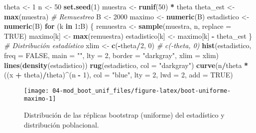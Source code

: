 \documentclass[
]{book}
\newenvironment{Shaded}{\begin{snugshade}}{\end{snugshade}}
\newcommand{\CommentTok}[1]{\textcolor[rgb]{0.56,0.35,0.01}{\textit{#1}}}
\newcommand{\ControlFlowTok}[1]{\textcolor[rgb]{0.13,0.29,0.53}{\textbf{#1}}}
\newcommand{\DataTypeTok}[1]{\textcolor[rgb]{0.13,0.29,0.53}{#1}}
\newcommand{\DecValTok}[1]{\textcolor[rgb]{0.00,0.00,0.81}{#1}}
\newcommand{\KeywordTok}[1]{\textcolor[rgb]{0.13,0.29,0.53}{\textbf{#1}}}
\newcommand{\NormalTok}[1]{#1}
\newcommand{\OperatorTok}[1]{\textcolor[rgb]{0.81,0.36,0.00}{\textbf{#1}}}
\newcommand{\OtherTok}[1]{\textcolor[rgb]{0.56,0.35,0.01}{#1}}
\newcommand{\StringTok}[1]{\textcolor[rgb]{0.31,0.60,0.02}{#1}}
\theoremstyle{definition}
\theoremstyle{definition}
\theoremstyle{definition}
\theoremstyle{remark}
\begin{document}
\begin{Shaded}
\begin{Highlighting}[]
\NormalTok{theta <-}\StringTok{ }\DecValTok{1}
\NormalTok{n <-}\StringTok{ }\DecValTok{50}
\KeywordTok{set.seed}\NormalTok{(}\DecValTok{1}\NormalTok{)}
\NormalTok{muestra <-}\StringTok{ }\KeywordTok{runif}\NormalTok{(}\DecValTok{50}\NormalTok{) }\OperatorTok{*}\StringTok{ }\NormalTok{theta}
\NormalTok{theta_est <-}\StringTok{ }\KeywordTok{max}\NormalTok{(muestra)}
\CommentTok{# Remuestreo}
\NormalTok{B <-}\StringTok{ }\DecValTok{2000}
\NormalTok{maximo <-}\StringTok{ }\KeywordTok{numeric}\NormalTok{(B)}
\NormalTok{estadistico <-}\StringTok{ }\KeywordTok{numeric}\NormalTok{(B)}
\ControlFlowTok{for}\NormalTok{ (k }\ControlFlowTok{in} \DecValTok{1}\OperatorTok{:}\NormalTok{B) \{}
\NormalTok{    remuestra <-}\StringTok{ }\KeywordTok{sample}\NormalTok{(muestra, n, }\DataTypeTok{replace =} \OtherTok{TRUE}\NormalTok{)}
\NormalTok{    maximo[k] <-}\StringTok{ }\KeywordTok{max}\NormalTok{(remuestra)}
\NormalTok{    estadistico[k] <-}\StringTok{ }\NormalTok{maximo[k] }\OperatorTok{-}\StringTok{ }\NormalTok{theta_est}
\NormalTok{\}}
\CommentTok{# Distribución estadístico}
\NormalTok{xlim <-}\StringTok{ }\KeywordTok{c}\NormalTok{(}\OperatorTok{-}\NormalTok{theta}\OperatorTok{/}\DecValTok{2}\NormalTok{, }\DecValTok{0}\NormalTok{) }\CommentTok{# c(-theta, 0)}
\KeywordTok{hist}\NormalTok{(estadistico, }\DataTypeTok{freq =} \OtherTok{FALSE}\NormalTok{, }\DataTypeTok{main =} \StringTok{""}\NormalTok{, }\DataTypeTok{lty =} \DecValTok{2}\NormalTok{, }
     \DataTypeTok{border =} \StringTok{"darkgray"}\NormalTok{, }\DataTypeTok{xlim =}\NormalTok{ xlim)}
\KeywordTok{lines}\NormalTok{(}\KeywordTok{density}\NormalTok{(estadistico))}
\KeywordTok{rug}\NormalTok{(estadistico, }\DataTypeTok{col =} \StringTok{"darkgray"}\NormalTok{)}
\KeywordTok{curve}\NormalTok{(n}\OperatorTok{/}\NormalTok{theta }\OperatorTok{*}\StringTok{ }\NormalTok{((x }\OperatorTok{+}\StringTok{ }\NormalTok{theta)}\OperatorTok{/}\NormalTok{theta)}\OperatorTok{^}\NormalTok{(n }\OperatorTok{-}\StringTok{ }\DecValTok{1}\NormalTok{), }\DataTypeTok{col =} \StringTok{"blue"}\NormalTok{, }\DataTypeTok{lty =} \DecValTok{2}\NormalTok{, }\DataTypeTok{lwd =} \DecValTok{2}\NormalTok{, }\DataTypeTok{add =} \OtherTok{TRUE}\NormalTok{)}
\end{Highlighting}
\end{Shaded}

\begin{figure}[!htb]

{\centering \texttt{[image: 04-mod\_boot\_unif\_files/figure-latex/boot-uniforme-maximo-1]} 

}

\caption{Distribución de las réplicas bootstrap (uniforme) del estadístico y distribución poblacional.}\label{fig:boot-uniforme-maximo}
\end{figure}
\end{document}
